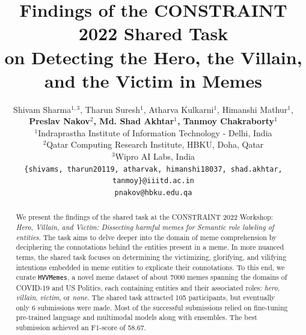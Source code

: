 \documentclass[11pt]{article}
\title{Findings of the CONSTRAINT 2022 Shared Task\\ on Detecting the Hero, the Villain, and the Victim in Memes}
\author{Shivam Sharma$^{1,3}$, Tharun Suresh$^1$, Atharva Kulkarni$^1$, Himanshi Mathur$^{1}$,\\ \textbf{Preslav Nakov$^2$, Md. Shad Akhtar$^1$, Tanmoy Chakraborty$^1$}\\
  $^1$Indraprastha Institute of Information Technology - Delhi, India  \\
  $^2$Qatar Computing Research Institute, HBKU, Doha, Qatar \\
  $^3$Wipro AI Labs, India\\
  \small\texttt{\{shivams, tharun20119, atharvak, himanshi18037, shad.akhtar, tanmoy\}@iiitd.ac.in}\\\small\texttt{pnakov@hbku.edu.qa}}
\newcommand{\dataset}{\textcolor{black}{\texttt{HVVMemes}}}
\newcommand{\model}{\texttt{MeRaiM}}
\begin{document}
\maketitle
\begin{abstract}

We present the findings of the shared task at the CONSTRAINT 2022 Workshop: \textit{Hero, Villain, and Victim: Dissecting harmful memes for Semantic role labeling of entities}. The task aims to delve deeper into the domain of meme comprehension by deciphering the connotations behind the entities present in a meme. In more nuanced terms, the shared task focuses on determining the victimizing, glorifying, and vilifying intentions embedded in meme entities to explicate their connotations. To this end, we curate \dataset, a novel meme dataset of about 7000 memes spanning the domains of COVID-19 and US Politics, each containing entities and their associated roles: \emph{hero}, \emph{villain}, \emph{victim}, or \emph{none}. The shared task attracted 105 participants, but eventually only 6 submissions were made. Most of the successful submissions relied on fine-tuning pre-trained language and multimodal models along with ensembles. The best submission achieved an F1-score of 58.67.
\end{abstract}
\end{document}
